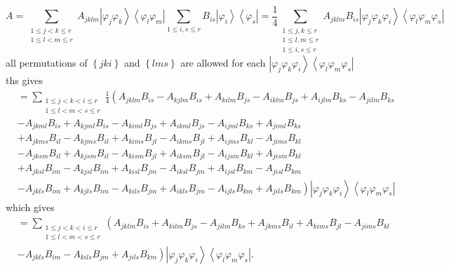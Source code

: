 \documentclass[aps,preprint]{revtex4}%
\begin{document}
\begin{equation}
A=\sum_{\substack{1\leq j<k\leq r\\1\leq l<m\leq r}}A_{jklm}\left\vert
\varphi_{j}\varphi_{k}\right\rangle \left\langle \varphi_{l}\varphi
_{m}\right\vert \sum_{1\leq i,s\leq r}B_{is}\left\vert \varphi_{i}%
\right\rangle \left\langle \varphi_{s}\right\vert =\frac{1}{4}\sum
_{\substack{1\leq j,k\leq r\\1\leq l,m\leq r\\1\leq i,s\leq r}}A_{jklm}%
B_{is}\left\vert \varphi_{j}\varphi_{k}\varphi_{i}\right\rangle \left\langle
\varphi_{l}\varphi_{m}\varphi_{s}\right\vert
\end{equation}
all permutations of $\left\{  jki\right\}  $ and $\left\{  lms\right\}  $ are
allowed for each $\left\vert \varphi_{j}\varphi_{k}\varphi_{i}\right\rangle
\left\langle \varphi_{l}\varphi_{m}\varphi_{s}\right\vert $ ths gives
\begin{align}
&  =\sum_{\substack{1\leq j<k<i\leq r\\1\leq l<m<s\leq r}}\frac{1}{4}\left(
A_{jklm}B_{is}-A_{kjlm}B_{is}+A_{kilm}B_{js}-A_{iklm}B_{js}+A_{ijlm}%
B_{ks}-A_{jilm}B_{ks}\right.  \nonumber\\
&  -A_{jkml}B_{is}+A_{kjml}B_{is}-A_{kiml}B_{js}+A_{ikml}B_{js}-A_{ijml}%
B_{ks}+A_{jiml}B_{ks}\nonumber\\
&  +A_{jkms}B_{il}-A_{kjms}B_{il}+A_{kims}B_{jl}-A_{ikms}B_{jl}+A_{ijms}%
B_{kl}-A_{jims}B_{kl}\nonumber\\
&  -A_{jksm}B_{il}+A_{kjsm}B_{il}-A_{kism}B_{jl}+A_{iksm}B_{jl}-A_{ijsm}%
B_{kl}+A_{jism}B_{kl}\nonumber\\
&  +A_{jksl}B_{im}-A_{kjsl}B_{im}+A_{kisl}B_{jm}-A_{iksl}B_{jm}+A_{ijsl}%
B_{km}-A_{jisl}B_{km}\nonumber\\
&  -\left.  A_{jkls}B_{im}+A_{kjls}B_{im}-A_{kils}B_{jm}+A_{ikls}%
B_{jm}-A_{ijls}B_{km}+A_{jils}B_{km}\right)  \left\vert \varphi_{j}\varphi
_{k}\varphi_{i}\right\rangle \left\langle \varphi_{l}\varphi_{m}\varphi
_{s}\right\vert
\end{align}
which gives%
\begin{align}
&  =\sum_{\substack{1\leq j<k<i\leq r\\1\leq l<m<s\leq r}}\left(
A_{jklm}B_{is}+A_{kilm}B_{js}-A_{jilm}B_{ks}\right.  +A_{jkms}B_{il}%
+A_{kims}B_{jl}-A_{jims}B_{kl}\\
&  -\left.  A_{jkls}B_{im}-A_{kils}B_{jm}+A_{jils}B_{km}\right)  \left\vert
\varphi_{j}\varphi_{k}\varphi_{i}\right\rangle \left\langle \varphi_{l}%
\varphi_{m}\varphi_{s}\right\vert .
\end{align}
\end{document}
